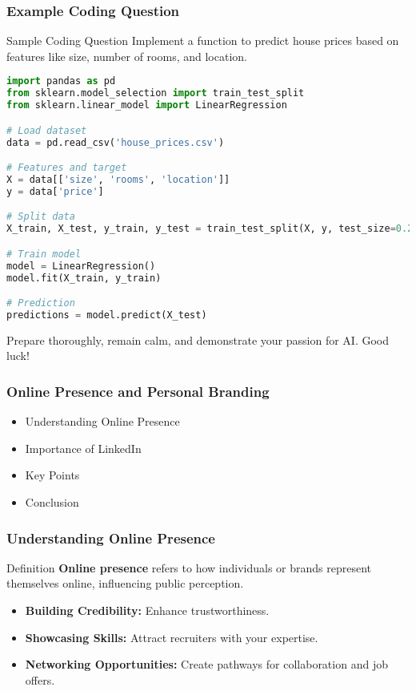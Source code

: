 \documentclass{beamer}
\begin{document}
\begin{frame}[fragile]
    \frametitle{Example Coding Question}
    \begin{block}{Sample Coding Question}
        Implement a function to predict house prices based on features like size, number of rooms, and location.
    \end{block}
    \begin{lstlisting}[language=Python]
import pandas as pd
from sklearn.model_selection import train_test_split
from sklearn.linear_model import LinearRegression

# Load dataset
data = pd.read_csv('house_prices.csv')

# Features and target
X = data[['size', 'rooms', 'location']]
y = data['price']

# Split data
X_train, X_test, y_train, y_test = train_test_split(X, y, test_size=0.2)

# Train model
model = LinearRegression()
model.fit(X_train, y_train)

# Prediction
predictions = model.predict(X_test)
    \end{lstlisting}
    Prepare thoroughly, remain calm, and demonstrate your passion for AI. Good luck!
\end{frame}

\begin{frame}[fragile]
    \frametitle{Online Presence and Personal Branding}
    \begin{itemize}
        \item Understanding Online Presence
        \item Importance of LinkedIn
        \item Key Points
        \item Conclusion
    \end{itemize}
\end{frame}

\begin{frame}[fragile]
    \frametitle{Understanding Online Presence}
    \begin{block}{Definition}
        \textbf{Online presence} refers to how individuals or brands represent themselves online, influencing public perception.
    \end{block}
    \begin{itemize}
        \item \textbf{Building Credibility:} Enhance trustworthiness.
        \item \textbf{Showcasing Skills:} Attract recruiters with your expertise.
        \item \textbf{Networking Opportunities:} Create pathways for collaboration and job offers.
    \end{itemize}
\end{frame}
\end{document}
